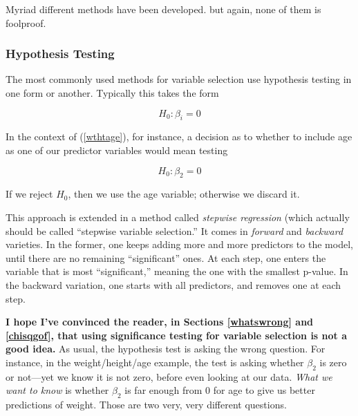 Myriad different methods have been developed.  but again, none of them
is foolproof.

\subsubsection{Hypothesis Testing}
\label{forwardbackward}

The most commonly used methods for variable selection use hypothesis
testing in one form or another.  Typically this takes the form

\begin{equation}
\label{idiotmethod}
H_0:  \beta_i = 0
\end{equation}

In the context of (\ref{wthtage}), for instance, a decision as to
whether to include age as one of our predictor variables would mean
testing

\begin{equation}
H_0:  \beta_2 = 0
\end{equation}

If we reject $H_0$, then we use the age variable; otherwise we discard
it.

This approach is extended in a method called {\it stepwise regression}
(which actually should be called ``stepwise variable selection.''  It
comes in {\it forward} and {\it backward} varieties.  In the former, one
keeps adding more and more predictors to the model, until there are no
remaining ``significant'' ones.  At each step, one enters the variable
that is most ``significant,'' meaning the one with the smallest p-value.
In the backward variation, one starts with all predictors, and removes
one at each step.

{\bf I hope I've convinced the reader, in Sections \ref{whatswrong} and
\ref{chisqgof}, that using significance testing for variable selection
is not a good idea.}  As usual, the hypothesis test is asking the wrong
question.  For instance, in the weight/height/age example, the test is
asking whether $\beta_2$ is zero or not---yet we know it is not zero,
before even looking at our data.  {\it What we want to know} is whether
$\beta_2$ is far enough from 0 for age to give us better predictions of
weight.  Those are two very, very different questions.


